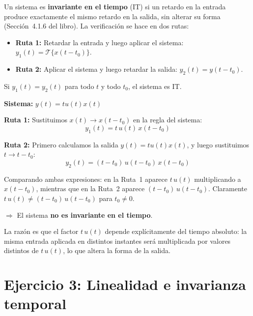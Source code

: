 \documentclass[10pt,a4paper]{article}
\begin{document}
	Un sistema es \textbf{invariante en el tiempo} (IT) si un retardo en la entrada produce exactamente el mismo retardo en la salida, sin alterar su forma (Sección~4.1.6 del libro). La verificación se hace en dos rutas:
	\begin{itemize}
		\item \textbf{Ruta 1:} Retardar la entrada y luego aplicar el sistema: $y_1(t) = \mathcal{T}\{x(t-t_0)\}$.
		\item \textbf{Ruta 2:} Aplicar el sistema y luego retardar la salida: $y_2(t) = y(t-t_0)$.
	\end{itemize}
	Si $y_1(t) = y_2(t)$ para todo $t$ y todo $t_0$, el sistema es IT.
	
	\textbf{Sistema:} $y(t) = tu(t)x(t)$
	
	\textbf{Ruta 1:} Sustituimos $x(t) \to x(t-t_0)$ en la regla del sistema:
	\[
	y_1(t) = t\,u(t)\,x(t-t_0)
	\]
	
	\textbf{Ruta 2:} Primero calculamos la salida $y(t) = tu(t)x(t)$, y luego sustituimos $t \to t-t_0$:
	\[
	y_2(t) = (t-t_0)\,u(t-t_0)\,x(t-t_0)
	\]
	
	Comparando ambas expresiones: en la Ruta~1 aparece $t\,u(t)$ multiplicando a $x(t-t_0)$, mientras que en la Ruta~2 aparece $(t-t_0)\,u(t-t_0)$. Claramente $t\,u(t) \neq (t-t_0)\,u(t-t_0)$ para $t_0 \neq 0$.
	
	$\Rightarrow$ El sistema \textbf{no es invariante en el tiempo}.
	
	La razón es que el factor $t\,u(t)$ depende explícitamente del tiempo absoluto: la misma entrada aplicada en distintos instantes será multiplicada por valores distintos de $t\,u(t)$, lo que altera la forma de la salida.

	\section*{Ejercicio 3: Linealidad e invarianza temporal}
	
\end{document}
